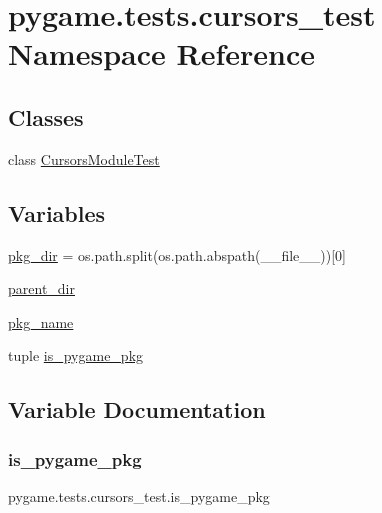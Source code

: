 \hypertarget{namespacepygame_1_1tests_1_1cursors__test}{}\section{pygame.\+tests.\+cursors\+\_\+test Namespace Reference}
\label{namespacepygame_1_1tests_1_1cursors__test}
\subsection*{Classes}
\begin{DoxyCompactItemize}
\item 
class \hyperlink{classpygame_1_1tests_1_1cursors__test_1_1_cursors_module_test}{Cursors\+Module\+Test}
\end{DoxyCompactItemize}
\subsection*{Variables}
\begin{DoxyCompactItemize}
\item 
\hyperlink{namespacepygame_1_1tests_1_1cursors__test_aa86128b2f2602770acb5d284a1f17796}{pkg\+\_\+dir} = os.\+path.\+split(os.\+path.\+abspath(\+\_\+\+\_\+file\+\_\+\+\_\+))\mbox{[}0\mbox{]}
\item 
\hyperlink{namespacepygame_1_1tests_1_1cursors__test_a039d55c5bfab6e0a9942414916b0dc8f}{parent\+\_\+dir}
\item 
\hyperlink{namespacepygame_1_1tests_1_1cursors__test_a3ad10600be2e9b1c6ca1eb8c2f525cc7}{pkg\+\_\+name}
\item 
tuple \hyperlink{namespacepygame_1_1tests_1_1cursors__test_a83675513beb4b8f88df480dc61911c1d}{is\+\_\+pygame\+\_\+pkg}
\end{DoxyCompactItemize}


\subsection{Variable Documentation}
\mbox{\label{namespacepygame_1_1tests_1_1cursors__test_a83675513beb4b8f88df480dc61911c1d}} 
\subsubsection{\texorpdfstring{is\+\_\+pygame\+\_\+pkg}{is\_pygame\_pkg}}
{\footnotesize\ttfamily pygame.\+tests.\+cursors\+\_\+test.\+is\+\_\+pygame\+\_\+pkg}


